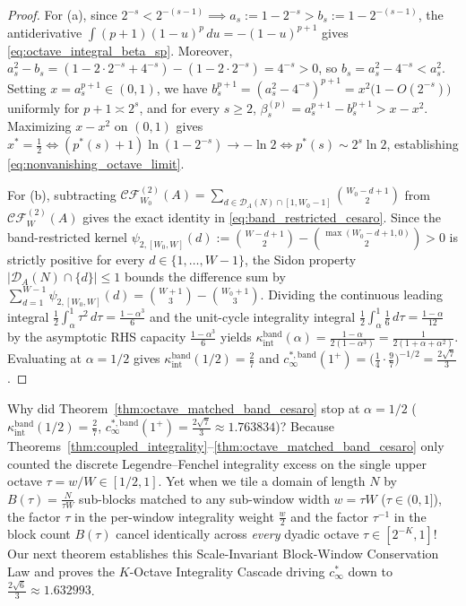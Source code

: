 \documentclass[11pt,reqno]{amsart}
\theoremstyle{definition}
\theoremstyle{remark}
\begin{document}
\begin{proof}
For (a), since $2^{-s} < 2^{-(s-1)} \implies a_s := 1 - 2^{-s} > b_s := 1 - 2^{-(s-1)}$, the antiderivative $\int (p+1)(1-u)^p\,du = -(1-u)^{p+1}$ gives \eqref{eq:octave_integral_beta_sp}. Moreover, $a_s^2 - b_s = (1 - 2 \cdot 2^{-s} + 4^{-s}) - (1 - 2 \cdot 2^{-s}) = 4^{-s} > 0$, so $b_s = a_s^2 - 4^{-s} < a_s^2$. Setting $x = a_s^{p+1} \in (0, 1)$, we have $b_s^{p+1} = (a_s^2 - 4^{-s})^{p+1} = x^2\bigl(1 - O(2^{-s})\bigr)$ uniformly for $p + 1 \asymp 2^s$, and for every $s \ge 2$, $\beta_s^{(p)} = a_s^{p+1} - b_s^{p+1} > x - x^2$. Maximizing $x - x^2$ on $(0, 1)$ gives $x^* = \frac{1}{2} \iff (p^*(s) + 1)\ln(1 - 2^{-s}) \to -\ln 2 \iff p^*(s) \sim 2^s \ln 2$, establishing \eqref{eq:nonvanishing_octave_limit}.

For (b), subtracting $\mathcal{CF}_{W_0}^{(2)}(A) = \sum_{d \in \mathcal{D}_A(N)\cap[1,W_0-1]} \binom{W_0 - d + 1}{2}$ from $\mathcal{CF}_W^{(2)}(A)$ gives the exact identity in \eqref{eq:band_restricted_cesaro}. Since the band-restricted kernel $\psi_{2,[W_0,W]}(d) := \binom{W - d + 1}{2} - \binom{\max(W_0 - d + 1, 0)}{2} > 0$ is strictly positive for every $d \in \{1, \dots, W - 1\}$, the Sidon property $|\mathcal{D}_A(N) \cap \{d\}| \le 1$ bounds the difference sum by $\sum_{d=1}^{W-1} \psi_{2,[W_0,W]}(d) = \binom{W + 1}{3} - \binom{W_0 + 1}{3}$. Dividing the continuous leading integral $\frac{1}{2}\int_\alpha^1 \tau^2\,d\tau = \frac{1 - \alpha^3}{6}$ and the unit-cycle integrality integral $\frac{1}{2}\int_\alpha^1 \frac{1}{6}\,d\tau = \frac{1 - \alpha}{12}$ by the asymptotic RHS capacity $\frac{1 - \alpha^3}{6}$ yields $\kappa_{\mathrm{int}}^{\mathrm{band}}(\alpha) = \frac{1 - \alpha}{2(1 - \alpha^3)} = \frac{1}{2(1 + \alpha + \alpha^2)}$. Evaluating at $\alpha = 1/2$ gives $\kappa_{\mathrm{int}}^{\mathrm{band}}(1/2) = \frac{2}{7}$ and $c_\infty^{*,\mathrm{band}}(1^+) = \bigl(\frac{1}{4}\cdot\frac{9}{7}\bigr)^{-1/2} = \frac{2\sqrt{7}}{3}$.
\end{proof}

Why did Theorem~\ref{thm:octave_matched_band_cesaro} stop at $\alpha = 1/2$ ($\kappa_{\mathrm{int}}^{\mathrm{band}}(1/2) = \frac{2}{7}$, $c_\infty^{*,\mathrm{band}}(1^+) = \frac{2\sqrt{7}}{3} \approx 1.763834$)? Because Theorems~\ref{thm:coupled_integrality}--\ref{thm:octave_matched_band_cesaro} only counted the discrete Legendre--Fenchel integrality excess on the single upper octave $\tau = w/W \in [1/2, 1]$. Yet when we tile a domain of length $N$ by $B(\tau) = \frac{N}{\tau W}$ sub-blocks matched to any sub-window width $w = \tau W$ ($\tau \in (0, 1]$), the factor $\tau$ in the per-window integrality weight $\frac{w}{2}$ and the factor $\tau^{-1}$ in the block count $B(\tau)$ cancel identically across \emph{every} dyadic octave $\tau \in [2^{-K}, 1]$! Our next theorem establishes this Scale-Invariant Block-Window Conservation Law and proves the $K$-Octave Integrality Cascade driving $c_\infty^*$ down to $\frac{2\sqrt{6}}{3} \approx 1.632993$.
\end{document}
